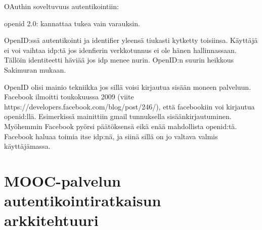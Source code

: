 \documentclass[finnish,gradu]{tktltiki}
\begin{document}
  OAuthin soveltuvuus autentikointiin:

  openid 2.0: kannattaa tukea vain varauksin.



  OpenID:ssä autentikointi ja identifier yleensä tiukasti kytketty toisiinsa. Käyttäjä ei voi vaihtaa idp:tä jos idenfierin verkkotunnus ei ole hänen hallinnassaan. Tällöin identiteetti häviää jos idp menee nurin. OpenID:n suurin heikkous Sakimuran mukaan.

  OpenID olisi mainio tekniikka jos sillä voisi kirjautua sisään moneen palveluun.
  Facebook ilmoitti toukokuussa 2009 (viite https://developers.facebook.com/blog/post/246/), että facebookiin voi kirjautua openid:llä. Esimerkissä mainittiin gmail tunnuksella sisäänkirjautuminen. Myöhemmin Facebook pyörsi päätöksensä eikä enää mahdollista openid:tä. Facebook haluaa toimia itse idp:nä, ja siinä sillä on jo valtava valmis käyttäjämassa.











\section{MOOC-palvelun autentikointiratkaisun arkkitehtuuri} %
\label{sec:mooc_palvelun_autentikointiratkaisun_arkkitehtuuri}
\end{document}
